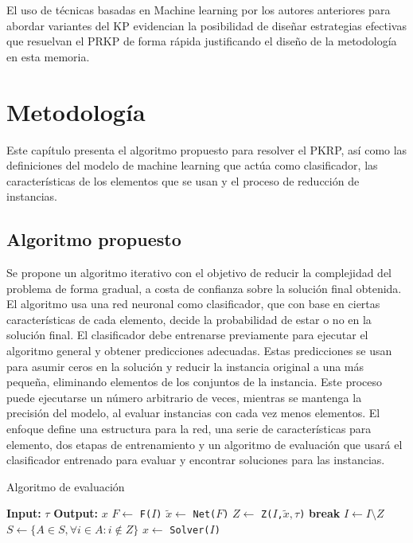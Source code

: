 \documentclass[spanish, a4paper, 12pt, openany,final]{book}
\begin{document}
El uso de técnicas basadas en Machine learning por los autores anteriores para abordar variantes del KP evidencian la posibilidad de diseñar estrategias efectivas que resuelvan el PRKP de forma rápida justificando el diseño de la metodología en esta memoria.
 

\chapter{Metodología}

Este capítulo presenta el algoritmo propuesto para resolver el PKRP, así como las definiciones del modelo de machine learning que actúa como clasificador, las características de los elementos que se usan y el proceso de reducción de instancias.

\section{Algoritmo propuesto}

Se propone un algoritmo iterativo con el objetivo de reducir la complejidad del problema de forma gradual, a costa de confianza sobre la solución final obtenida. El algoritmo usa una red neuronal como clasificador, que con base en ciertas características de cada elemento, decide la probabilidad de estar o no en la solución final. El clasificador debe entrenarse previamente para ejecutar el algoritmo general y obtener predicciones adecuadas. Estas predicciones se usan para asumir ceros en la solución y reducir la instancia original a una más pequeña, eliminando elementos de los conjuntos de la instancia. Este proceso puede ejecutarse un número arbitrario de veces, mientras se mantenga la precisión del modelo, al evaluar instancias con cada vez menos elementos. El enfoque define una estructura para la red, una serie de características para elemento, dos etapas de entrenamiento y un algoritmo de evaluación que usará el clasificador entrenado para evaluar y encontrar soluciones para las instancias.


\begin{algorithm}[H]
	\caption{Algoritmo de evaluación}\label{alg:general}
	\begin{algorithmic}[1]
		\Statex \textbf{Input:} $\tau$
		\Statex \textbf{Output:} $x$
		\Loop
		\State $F \gets$ \texttt{F($I$)}\label{alg1:full_features}
		\State $\tilde{x} \gets$ \texttt{Net($F$)} \label{alg1:get_pred}
		\State $Z \gets$ \texttt{Z($I$,$\tilde{x},\tau$)} \label{alg1:get_Z}
		 \label{alg1:break_condition}
		\State \textbf{break}
		\EndIf
		\State $I \gets I\setminus Z$ 								\label{alg1:update_I}
		\State $S \gets \{A \in S, \forall i \in A: i \notin Z\}$  \label{alg1:update_S}
		\EndLoop
		\State $x \gets$ \texttt{Solver($I$)} \label{alg1:exact_solver} 
	\end{algorithmic}
\end{algorithm}
\end{document}
